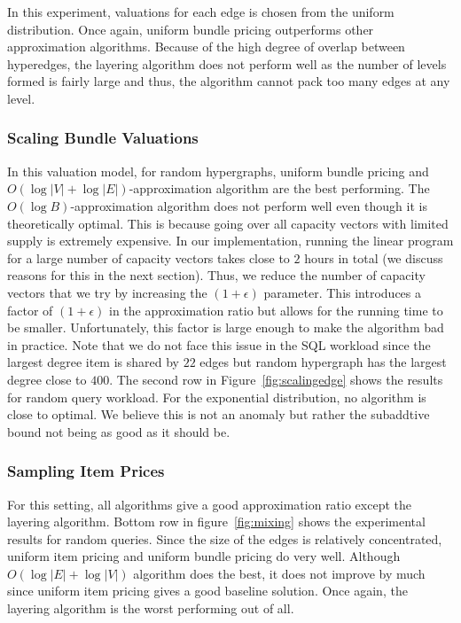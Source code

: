  In this experiment, valuations for each edge is chosen from the uniform distribution. Once again, uniform bundle pricing outperforms other approximation algorithms. Because of the high degree of overlap between hyperedges, the layering algorithm does not perform well as the number of levels formed is fairly large and thus, the algorithm cannot pack too many edges at any level.
 
 \subsubsection{Scaling Bundle Valuations} In this valuation model, for random hypergraphs, uniform bundle pricing and $O(\log |V|+\log |E|)$-approximation algorithm are the best performing. The $O(\log B)$-approximation algorithm does not perform well even though it is theoretically optimal. This is because going over all capacity vectors with limited supply is extremely expensive. In our implementation, running the linear program for a large number of capacity vectors takes close to $2$ hours in total (we discuss reasons for this in the next section). Thus, we reduce the number of capacity vectors that we try by increasing the $(1+\epsilon)$ parameter. This introduces a factor of $(1+\epsilon)$ in the approximation ratio but allows for the running time to be smaller. Unfortunately, this factor is large enough to make the algorithm bad in practice. Note that we do not face this issue in the SQL workload since the largest degree item is shared by $22$ edges but random hypergraph has the largest degree close to $400$. The second row in Figure~\ref{fig:scalingedge} shows the results for random query workload. For the exponential distribution, no algorithm is close to optimal. We believe this is not an anomaly but rather the subaddtive bound not being as good as it should be.
 
 \subsubsection{Sampling Item Prices} For this setting, all algorithms give a good approximation ratio except the layering algorithm. Bottom row in figure~\ref*{fig:mixing} shows the experimental results for random queries. Since the size of the edges is relatively concentrated, uniform item pricing and uniform bundle pricing do very well. Although $O(\log |E| + \log |V|)$ algorithm does the best, it does not improve by much since uniform item pricing gives a good baseline solution.  Once again, the layering algorithm is the worst performing out of all.
 
